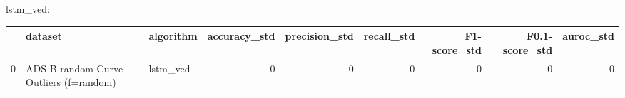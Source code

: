 lstm_ved:

\begin{tabular}{rllrrrrrr}
\hline
    & dataset                                & algorithm   &   accuracy\_std &   precision\_std &   recall\_std &   F1-score\_std &   F0.1-score\_std &   auroc\_std \\
\hline
  0 & ADS-B random Curve Outliers (f=random) & lstm\_ved    &              0 &               0 &            0 &              0 &                0 &           0 \\
\hline
\end{tabular}

